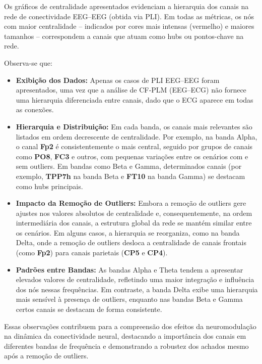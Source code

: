 Os gráficos de centralidade apresentados evidenciam a hierarquia dos canais na rede de conectividade EEG–EEG (obtida via PLI). Em todas as métricas, os nós com maior centralidade – indicados por cores mais intensas (vermelho) e maiores tamanhos – correspondem a canais que atuam como hubs ou pontos-chave na rede. 

Observa-se que:
\begin{itemize}
    \item \textbf{Exibição dos Dados:} Apenas os casos de PLI EEG–EEG foram apresentados, uma vez que a análise de CF‐PLM (EEG–ECG) não fornece uma hierarquia diferenciada entre canais, dado que o ECG aparece em todas as conexões.
    \item \textbf{Hierarquia e Distribuição:} Em cada banda, os canais mais relevantes são listados em ordem decrescente de centralidade. Por exemplo, na banda Alpha, o canal \textbf{Fp2} é consistentemente o mais central, seguido por grupos de canais como \textbf{PO8}, \textbf{FC3} e outros, com pequenas variações entre os cenários com e sem outliers. Em bandas como Beta e Gamma, determinados canais (por exemplo, \textbf{TPP7h} na banda Beta e \textbf{FT10} na banda Gamma) se destacam como hubs principais.
    \item \textbf{Impacto da Remoção de Outliers:} Embora a remoção de outliers gere ajustes nos valores absolutos de centralidade e, consequentemente, na ordem intermediária dos canais, a estrutura global da rede se mantém similar entre os cenários. Em alguns casos, a hierarquia se reorganiza, como na banda Delta, onde a remoção de outliers desloca a centralidade de canais frontais (como \textbf{Fp2}) para canais parietais (\textbf{CP5} e \textbf{CP4}).
    \item \textbf{Padrões entre Bandas:} As bandas Alpha e Theta tendem a apresentar elevados valores de centralidade, refletindo uma maior integração e influência dos nós nessas frequências. Em contraste, a banda Delta exibe uma hierarquia mais sensível à presença de outliers, enquanto nas bandas Beta e Gamma certos canais se destacam de forma consistente.
\end{itemize}

Essas observações contribuem para a compreensão dos efeitos da neuromodulação na dinâmica da conectividade neural, destacando a importância dos canais em diferentes bandas de frequência e demonstrando a robustez dos achados mesmo após a remoção de outliers.
